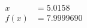 \documentclass[preview]{standalone}
\begin{document}
\begin{align*}
x &= 5.0158\\f(x) &= 7.9999690
\end{align*}
\end{document}
